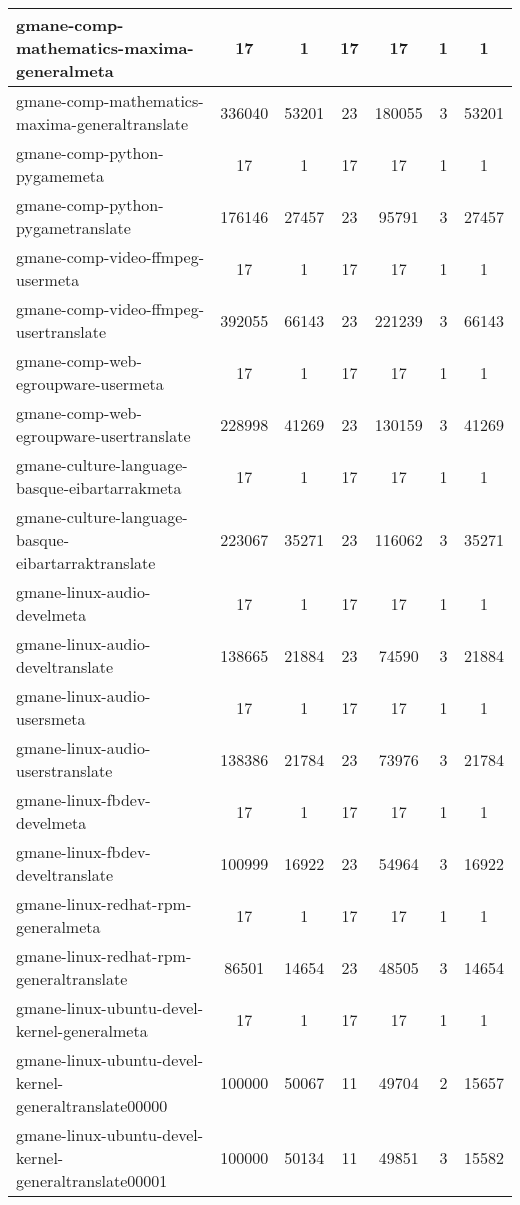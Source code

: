 \begin{table*}[h!]
\begin{center}
\begin{tabular}{| l | c | c | c | c | c | c |}
gmane-comp-mathematics-maxima-generalmeta & 17  & 1  & 17  & 17  & 1  & 1 \\\hline
gmane-comp-mathematics-maxima-generaltranslate & 336040  & 53201  & 23  & 180055  & 3  & 53201 \\\hline
gmane-comp-python-pygamemeta & 17  & 1  & 17  & 17  & 1  & 1 \\\hline
gmane-comp-python-pygametranslate & 176146  & 27457  & 23  & 95791  & 3  & 27457 \\\hline
gmane-comp-video-ffmpeg-usermeta & 17  & 1  & 17  & 17  & 1  & 1 \\\hline
gmane-comp-video-ffmpeg-usertranslate & 392055  & 66143  & 23  & 221239  & 3  & 66143 \\\hline
gmane-comp-web-egroupware-usermeta & 17  & 1  & 17  & 17  & 1  & 1 \\\hline
gmane-comp-web-egroupware-usertranslate & 228998  & 41269  & 23  & 130159  & 3  & 41269 \\\hline
gmane-culture-language-basque-eibartarrakmeta & 17  & 1  & 17  & 17  & 1  & 1 \\\hline
gmane-culture-language-basque-eibartarraktranslate & 223067  & 35271  & 23  & 116062  & 3  & 35271 \\\hline
gmane-linux-audio-develmeta & 17  & 1  & 17  & 17  & 1  & 1 \\\hline
gmane-linux-audio-develtranslate & 138665  & 21884  & 23  & 74590  & 3  & 21884 \\\hline
gmane-linux-audio-usersmeta & 17  & 1  & 17  & 17  & 1  & 1 \\\hline
gmane-linux-audio-userstranslate & 138386  & 21784  & 23  & 73976  & 3  & 21784 \\\hline
gmane-linux-fbdev-develmeta & 17  & 1  & 17  & 17  & 1  & 1 \\\hline
gmane-linux-fbdev-develtranslate & 100999  & 16922  & 23  & 54964  & 3  & 16922 \\\hline
gmane-linux-redhat-rpm-generalmeta & 17  & 1  & 17  & 17  & 1  & 1 \\\hline
gmane-linux-redhat-rpm-generaltranslate & 86501  & 14654  & 23  & 48505  & 3  & 14654 \\\hline
gmane-linux-ubuntu-devel-kernel-generalmeta & 17  & 1  & 17  & 17  & 1  & 1 \\\hline
gmane-linux-ubuntu-devel-kernel-generaltranslate00000 & 100000  & 50067  & 11  & 49704  & 2  & 15657 \\\hline
gmane-linux-ubuntu-devel-kernel-generaltranslate00001 & 100000  & 50134  & 11  & 49851  & 3  & 15582 \\\hline

\end{tabular}
\end{center}
\end{table*}
